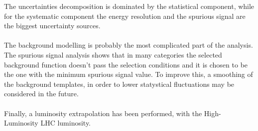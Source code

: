 The uncertainties decomposition is dominated by the statistical component, while for the systematic component the energy resolution and the spurious signal are the biggest uncertainty sources.
\\\\
The background modelling is probably the most complicated part of the analysis.
The spurious signal analysis shows that in many categories the selected background function doesn't pass the selection conditions and it is chosen to be the one with the minimum spurious signal value. To improve this, a smoothing of the background templates, in order to lower statystical fluctuations may be considered in the future.
\\\\
Finally, a luminosity extrapolation has been performed, with the High-Luminosity LHC luminosity.